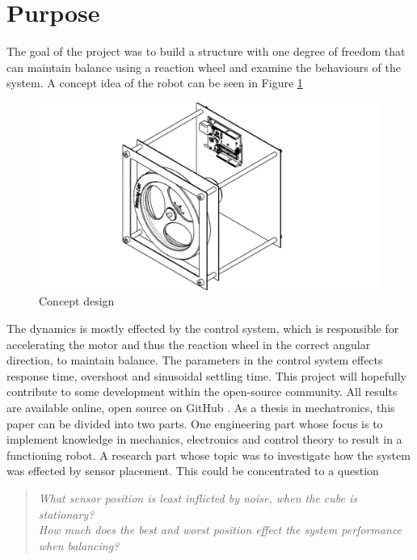 \documentclass[a4paper,11pt]{kth-mag}
\begin{document}
\section{Purpose}
The goal of the project was to build a structure with one degree of freedom that can maintain balance using a reaction wheel and examine the behaviours of the system. A concept idea of the robot can be seen in Figure \ref{Figure: concept idea}
\begin{figure}[!htb] 
\centering
\includegraphics[width = \textwidth]{concept.pdf}
\caption{Concept design}
\label{Figure: concept idea}
\end{figure}

The dynamics is mostly effected by the control system, which is responsible for accelerating the motor and thus the reaction wheel in the  correct angular direction, to maintain balance. The parameters in the control system effects response time, overshoot and sinusoidal settling time.
This project will hopefully contribute to some development within the open-source community.
All results are available online, open source on GitHub \cite{Github}.
As a thesis in mechatronics, this paper can be divided into two parts. One engineering part whose focus is to implement knowledge in mechanics, electronics and control theory to result in a functioning robot. A research part whose topic was to investigate how the system was effected by sensor placement. This could be concentrated to a question 

\begin{quote}
\textit{
What sensor position is least inflicted by noise, when the cube is stationary?
} \\

\textit{How much does the best and worst position effect the system performance when balancing?
}
\end{quote}
\end{document}
